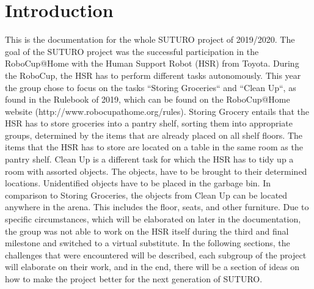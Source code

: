 \documentclass[main.tex]{subfiles}
\begin{document}
	\chapter{Introduction}
	
This is the documentation for the whole SUTURO project of 2019/2020. The goal of the SUTURO project was the successful participation in the RoboCup@Home with the Human Support Robot (HSR) from Toyota. During the RoboCup, the HSR has to perform different tasks autonomously.
This year the group chose to focus on the tasks “Storing Groceries“ and “Clean Up“, as found in the Rulebook of 2019, which can be found on the RoboCup@Home website (http://www.robocupathome.org/rules). 
Storing Grocery entails that the HSR has to store groceries into a pantry shelf, sorting them into appropriate groups, determined by the items that are already placed on all shelf floors. The items that the HSR has to store are located on a table in the same room as the pantry shelf.
Clean Up is a different task for which the HSR has to tidy up a room with assorted objects. The objects, have to be brought to their determined locations. Unidentified objects have to be placed in the garbage bin. In comparison to Storing Groceries, the objects from Clean Up can be located anywhere in the arena. This includes the floor, seats, and other furniture.
Due to specific circumstances, which will be elaborated on later in the documentation, the group was not able to work on the HSR itself during the third and final milestone and switched to a virtual substitute.
In the following sections, the challenges that were encountered will be described, each subgroup of the project will elaborate on their work, and in the end, there will be a section of ideas on how to make the project better for the next generation of SUTURO.
	
\end{document}
